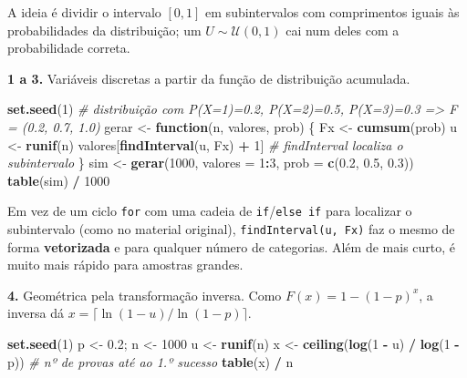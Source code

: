 \documentclass[
  portuguese,
  11pt,
  openany]{book}
\newenvironment{Shaded}{\begin{snugshade}}{\end{snugshade}}
\newcommand{\AttributeTok}[1]{\textcolor[rgb]{0.13,0.29,0.53}{#1}}
\newcommand{\CommentTok}[1]{\textcolor[rgb]{0.56,0.35,0.01}{\textit{#1}}}
\newcommand{\ControlFlowTok}[1]{\textcolor[rgb]{0.13,0.29,0.53}{\textbf{#1}}}
\newcommand{\DecValTok}[1]{\textcolor[rgb]{0.00,0.00,0.81}{#1}}
\newcommand{\FloatTok}[1]{\textcolor[rgb]{0.00,0.00,0.81}{#1}}
\newcommand{\FunctionTok}[1]{\textcolor[rgb]{0.13,0.29,0.53}{\textbf{#1}}}
\newcommand{\NormalTok}[1]{#1}
\newcommand{\OtherTok}[1]{\textcolor[rgb]{0.56,0.35,0.01}{#1}}
\newcommand{\SpecialCharTok}[1]{\textcolor[rgb]{0.81,0.36,0.00}{\textbf{#1}}}
\begin{document}
A ideia é dividir o intervalo \([0,1]\) em subintervalos com comprimentos iguais
às probabilidades da distribuição; um \(U \sim \mathcal{U}(0,1)\) cai num deles com
a probabilidade correta.

\textbf{1 a 3.} Variáveis discretas a partir da função de distribuição acumulada.

\begin{Shaded}
\begin{Highlighting}[]
\FunctionTok{set.seed}\NormalTok{(}\DecValTok{1}\NormalTok{)}
\CommentTok{\# distribuição com P(X=1)=0.2, P(X=2)=0.5, P(X=3)=0.3  =\textgreater{}  F = (0.2, 0.7, 1.0)}
\NormalTok{gerar }\OtherTok{\textless{}{-}} \ControlFlowTok{function}\NormalTok{(n, valores, prob) \{}
\NormalTok{  Fx }\OtherTok{\textless{}{-}} \FunctionTok{cumsum}\NormalTok{(prob)}
\NormalTok{  u }\OtherTok{\textless{}{-}} \FunctionTok{runif}\NormalTok{(n)}
\NormalTok{  valores[}\FunctionTok{findInterval}\NormalTok{(u, Fx) }\SpecialCharTok{+} \DecValTok{1}\NormalTok{]   }\CommentTok{\# findInterval localiza o subintervalo}
\NormalTok{\}}
\NormalTok{sim }\OtherTok{\textless{}{-}} \FunctionTok{gerar}\NormalTok{(}\DecValTok{1000}\NormalTok{, }\AttributeTok{valores =} \DecValTok{1}\SpecialCharTok{:}\DecValTok{3}\NormalTok{, }\AttributeTok{prob =} \FunctionTok{c}\NormalTok{(}\FloatTok{0.2}\NormalTok{, }\FloatTok{0.5}\NormalTok{, }\FloatTok{0.3}\NormalTok{))}
\FunctionTok{table}\NormalTok{(sim) }\SpecialCharTok{/} \DecValTok{1000}
\end{Highlighting}
\end{Shaded}

Em vez de um ciclo \texttt{for} com uma cadeia de \texttt{if}/\texttt{else\ if} para localizar o
subintervalo (como no material original), \texttt{findInterval(u,\ Fx)} faz o mesmo de
forma \textbf{vetorizada} e para qualquer número de categorias. Além de mais curto, é
muito mais rápido para amostras grandes.

\textbf{4.} Geométrica pela transformação inversa. Como \(F(x) = 1 - (1-p)^x\), a inversa
dá \(x = \big\lceil \ln(1-u) / \ln(1-p) \big\rceil\).

\begin{Shaded}
\begin{Highlighting}[]
\FunctionTok{set.seed}\NormalTok{(}\DecValTok{1}\NormalTok{)}
\NormalTok{p }\OtherTok{\textless{}{-}} \FloatTok{0.2}\NormalTok{; n }\OtherTok{\textless{}{-}} \DecValTok{1000}
\NormalTok{u }\OtherTok{\textless{}{-}} \FunctionTok{runif}\NormalTok{(n)}
\NormalTok{x }\OtherTok{\textless{}{-}} \FunctionTok{ceiling}\NormalTok{(}\FunctionTok{log}\NormalTok{(}\DecValTok{1} \SpecialCharTok{{-}}\NormalTok{ u) }\SpecialCharTok{/} \FunctionTok{log}\NormalTok{(}\DecValTok{1} \SpecialCharTok{{-}}\NormalTok{ p))   }\CommentTok{\# nº de provas até ao 1.º sucesso}
\FunctionTok{table}\NormalTok{(x) }\SpecialCharTok{/}\NormalTok{ n}
\end{Highlighting}
\end{Shaded}
\end{document}
